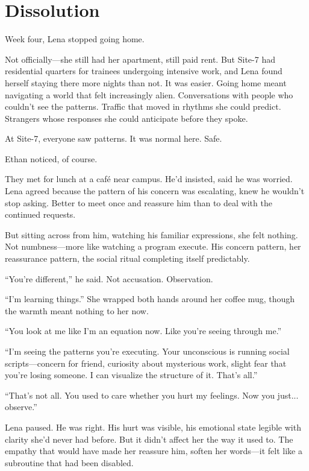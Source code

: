 \chapter{Dissolution}

Week four, Lena stopped going home.

Not officially—she still had her apartment, still paid rent. But Site-7 had residential quarters for trainees undergoing intensive work, and Lena found herself staying there more nights than not. It was easier. Going home meant navigating a world that felt increasingly alien. Conversations with people who couldn't see the patterns. Traffic that moved in rhythms she could predict. Strangers whose responses she could anticipate before they spoke.

At Site-7, everyone saw patterns. It was normal here. Safe.

Ethan noticed, of course.

They met for lunch at a café near campus. He'd insisted, said he was worried. Lena agreed because the pattern of his concern was escalating, knew he wouldn't stop asking. Better to meet once and reassure him than to deal with the continued requests.

But sitting across from him, watching his familiar expressions, she felt nothing. Not numbness—more like watching a program execute. His concern pattern, her reassurance pattern, the social ritual completing itself predictably.

``You're different,'' he said. Not accusation. Observation.

``I'm learning things.'' She wrapped both hands around her coffee mug, though the warmth meant nothing to her now.

``You look at me like I'm an equation now. Like you're seeing through me.''

``I'm seeing the patterns you're executing. Your unconscious is running social scripts—concern for friend, curiosity about mysterious work, slight fear that you're losing someone. I can visualize the structure of it. That's all.''

``That's not all. You used to care whether you hurt my feelings. Now you just... observe.''

Lena paused. He was right. His hurt was visible, his emotional state legible with clarity she'd never had before. But it didn't affect her the way it used to. The empathy that would have made her reassure him, soften her words—it felt like a subroutine that had been disabled.

